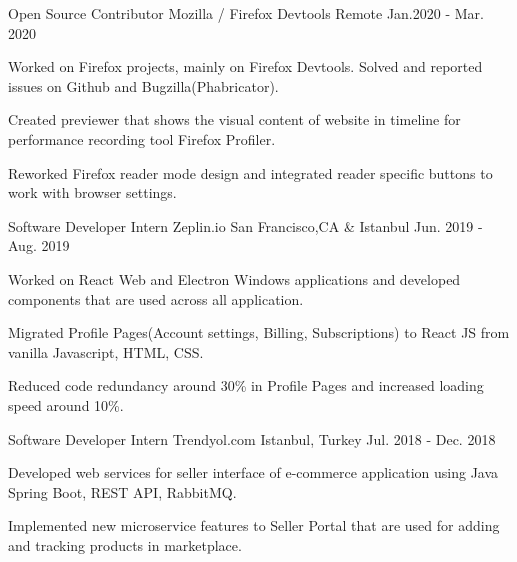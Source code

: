 \begin{cventries}
  \cvopenentry
   {Open Source Contributor} %
    {Mozilla / Firefox Devtools} %
    {Remote} %
    {Jan.2020 - Mar. 2020} %
    {
      \begin{cvitems} %
        \item {Worked on Firefox projects, mainly on Firefox Devtools. Solved and reported issues on Github and Bugzilla(Phabricator).}
        \item {Created previewer that shows the visual content of website in timeline for performance recording tool Firefox Profiler.
        \item {Reworked Firefox reader mode design and integrated reader specific buttons to work with browser settings.}
}
      \end{cvitems}
    }
  \cvopenentry
   {Software Developer Intern} %
    {Zeplin.io} %
    {San Francisco,CA \& Istanbul} %
    {Jun. 2019 - Aug. 2019} %
    {
      \begin{cvitems} %
        \item {Worked on React Web and Electron Windows applications and developed components that are used across all application.}
		\item {Migrated Profile Pages(Account settings, Billing, Subscriptions) to React JS from vanilla Javascript, HTML, CSS.}
        \item {Reduced code redundancy around 30\% in Profile Pages and increased loading speed around 10\%. }
      \end{cvitems}
    }
  \cvopenentry
   {Software Developer Intern} %
    {Trendyol.com} %
    {Istanbul, Turkey} %
    {Jul. 2018 - Dec. 2018} %
    {
      \begin{cvitems} %
		 \item {Developed web services for seller interface of e-commerce application using Java Spring Boot, REST API, RabbitMQ.}
        \item {Implemented new microservice features to Seller Portal that are used for adding and tracking products in marketplace.}
      \end{cvitems}
    }



\end{cventries}
